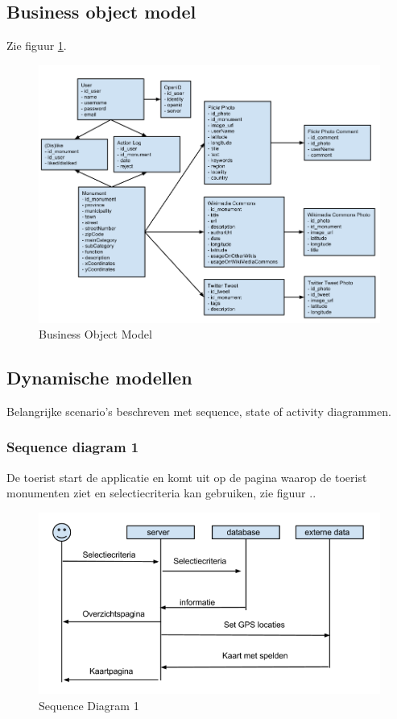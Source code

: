 \documentclass[a4paper,10pt]{article}
\begin{document}
	\subsection{Business object model}
		Zie figuur \ref{bom}.
		\begin{figure}[ht!]
			\centering
			\includegraphics[width=\textwidth]{BusinessObjectModel.png}
			\caption{Business Object Model \label{bom}}
		\end{figure}
		\subsection{Dynamische modellen}
			Belangrijke scenario's beschreven met sequence, state of activity diagrammen.
			\subsubsection{Sequence diagram 1}
			De toerist start de applicatie en komt uit op de pagina waarop de toerist monumenten ziet en selectiecriteria kan gebruiken, zie figuur .. %
			\begin{figure}[ht!]
				\centering
				\includegraphics[width=\textwidth]{sequence1.png}
				\caption{Sequence Diagram 1 \label{sequence1}}
			\end{figure}
\end{document}

